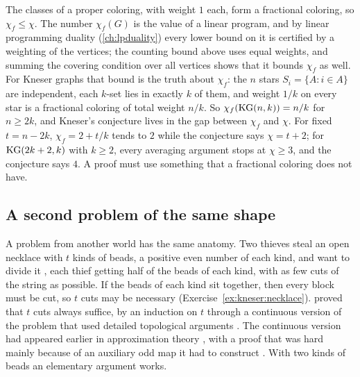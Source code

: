 \begin{refsection}
The classes of a proper coloring, with weight $1$ each, form a fractional coloring, so $\chi_f\le\chi$. The number $\chi_f(G)$ is the value of a linear program, and by linear programming duality (\cref{ch:lpduality}) every lower bound on it is certified by a weighting of the vertices; the counting bound above uses equal weights, and summing the covering condition over all vertices shows that it bounds $\chi_f$ as well. For Kneser graphs that bound is the truth about $\chi_f$: the $n$ stars $S_i=\{A:i\in A\}$ are independent, each $k$-set lies in exactly $k$ of them, and weight $1/k$ on every star is a fractional coloring of total weight $n/k$. So $\chi_f(\mathrm{KG}(n,k))=n/k$ for $n\ge2k$, and Kneser's conjecture lives in the gap between $\chi_f$ and $\chi$. For fixed $t=n-2k$, $\chi_f=2+t/k$ tends to $2$ while the conjecture says $\chi=t+2$; for $\mathrm{KG}(2k+2,k)$ with $k\ge2$, every averaging argument stops at $\chi\ge3$, and the conjecture says $4$. A proof must use something that a fractional coloring does not have.

\subsection{A second problem of the same shape}

%
A problem from another world has the same anatomy. Two thieves steal an open necklace with $t$ kinds of beads, a positive even number of each kind, and want to divide it , each thief getting half of the beads of each kind, with as few cuts of the string as possible. If the beads of each kind sit together, then every block must be cut, so $t$ cuts may be necessary (Exercise~\ref{ex:kneser:necklace}). \textcite{GoldbergWest1985} proved that $t$ cuts always suffice, by an induction on $t$ through a continuous version of the problem that used detailed topological arguments \parencite{AlonWest1986}. The continuous version had appeared earlier in approximation theory \parencite{HobbyRice1965}, with a proof that was hard mainly because of an auxiliary odd map it had to construct \parencite{Pinkus1976}. With two kinds of beads an elementary argument works.


\end{refsection}
